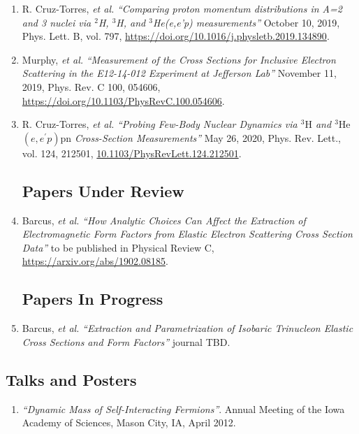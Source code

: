 \documentclass[letterpaper,10pt]{article}
\renewenvironment{itemize}{
  \begin{list}{}{
    \setlength{\leftmargin}{1.5em}
  }
}{
  \end{list}
}
\begin{document}
{\begin{enumerate}

\item R. Cruz-Torres, \textit{et al.} \textit{``Comparing proton momentum distributions in A=2 and 3 nuclei via $^2$H, $^3$H, and $^3$He(e,e'p) measurements''} October 10, 2019, Phys. Lett. B, vol. 797, \url{https://doi.org/10.1016/j.physletb.2019.134890}.

\item Murphy, \textit{et al.} \textit{``Measurement of the Cross Sections for Inclusive Electron Scattering in the E12-14-012 Experiment at Jefferson Lab''} November 11, 2019, Phys. Rev. C 100, 054606, \url{https://doi.org/10.1103/PhysRevC.100.054606}.

\item R. Cruz-Torres, \textit{et al.} \textit{``Probing Few-Body Nuclear Dynamics via $^{3}\mathrm{H}$ and $^{3}\mathrm{He}$ $(e,{e}^{\ensuremath{'}}p)\mathrm{pn}$ Cross-Section Measurements''} May 26, 2020, Phys. Rev. Lett., vol. 124, 212501, \url{10.1103/PhysRevLett.124.212501}.

\subsection*{Papers Under Review}
\item Barcus, \textit{et al.} \textit{``How Analytic Choices Can Affect the Extraction of Electromagnetic Form Factors from Elastic Electron Scattering Cross Section Data''} to be published in Physical Review C, \url{https://arxiv.org/abs/1902.08185}.

\subsection*{Papers In Progress}
\item Barcus, \textit{et al.} \textit{``Extraction and Parametrization of Isobaric Trinucleon Elastic Cross Sections and Form Factors''} journal TBD.

\end{enumerate}
\subsection*{Talks and Posters}


	\begin{enumerate}\itemsep1pt \parskip2pt 
		\setcounter{enumi}{0}
		\item \textit{``Dynamic Mass of Self-Interacting Fermions''}. Annual Meeting of the Iowa Academy of Sciences, Mason City, IA, April 2012.


\end{enumerate}}
\end{document}
